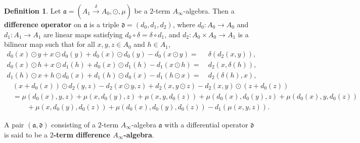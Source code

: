 \documentclass[a4paper,reqno,10pt]{amsart}
\theoremstyle{plain}
\theoremstyle{definition}
\newtheorem{defn}[thm]{Definition}
\theoremstyle{remark}
\begin{document}
\begin{defn}
    Let $\mathfrak{a} = (A_1 \xrightarrow{\delta} A_0, \odot, \mu)$ be a $2$-term $A_\infty$-algebra. Then a {\bf difference operator} on $\mathfrak{a}$ is a triple $\mathfrak{d} = (d_0, d_1, d_2)$, where $d_0 : A_0 \rightarrow A_0$ and $d_1 : A_1 \rightarrow A_1$ are linear maps satisfying $d_0 \circ \delta = \delta \circ d_1$, and $d_2 : A_0 \times A_0 \rightarrow A_1$ is a bilinear map such that for all $x, y, z \in A_0$ and $h \in A_1$,
    \begin{align}
        d_0 (x) \odot y + x \odot d_0 (y) + d_0 (x) \odot d_0 (y) - d_0 (x \odot y) =~& \delta (d_2 (x, y)), \label{d1} \tag{D1} \\
        d_0 (x) \odot h + x \odot d_1 (h) + d_0 (x) \odot d_1 (h) - d_1 (x \odot h) =~& d_2 (x, \delta (h)), \label{d2} \tag{D2}\\
        d_1 (h) \odot x + h \odot d_0 (x) + d_1 (h) \odot d_0 (x) - d_1 (h \odot x) =~& d_2 (\delta (h), x), \label{d3} \tag{D3}
        \end{align}
        \begin{align}
        &(x + d_0 (x)) \odot d_2 (y, z) - d_2 (x \odot y, z) + d_2 (x, y \odot z) - d_2 (x, y) \odot (z + d_0 (z)) \nonumber \\
        &= \mu (d_0 (x), y, z) + \mu (x, d_0 (y), z) + \mu (x,y, d_0 (z)) + \mu (d_0 (x), d_0 (y), z) + \mu ( d_0 (x), y, d_0 (z)) \nonumber \\ 
        & \qquad + \mu (x, d_0 (y), d_0 (z)) 
        + \mu (d_0 (x), d_0 (y), d_0 (z)) - d_1 (\mu (x, y, z) ). \label{d4} \tag{D4}
    \end{align}
\end{defn}
\noindent A pair $(\mathfrak{a}, \mathfrak{d})$ consisting of a $2$-term $A_\infty$-algebra $\mathfrak{a}$ with a differential operator $\mathfrak{d}$ is said to be a {\bf $2$-term difference $A_\infty$-algebra}.
\end{document}
